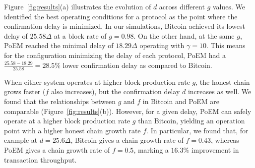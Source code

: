 Figure~\ref{fig:results}(a) illustrates the evolution of $d$ across different $g$ values. We
identified the best operating conditions for a protocol as the point where the
confirmation delay is minimized. In our simulations, Bitcoin achieved its lowest
delay of $25.58 \Delta$ at a block rate of $g=0.98$. On the other hand, at the same
$g$, PoEM reached the minimal delay of $18.29 \Delta$ operating with
$\gamma=10$. This means for the configuration minimizing the delay of each protocol,
PoEM had a $\frac{25.58 - 18.29}{25.58} = 28.5\%$ lower confirmation delay as compared to Bitcoin.

When either system operates at higher block production rate $g$, the honest chain
grows faster ($f$ also increases), but the confirmation delay $d$ increases as well.
We found that the relationships between $g$ and $f$ in Bitcoin and PoEM are
comparable (Figure~\ref{fig:results}(b)). However, for a given delay, PoEM can
safely operate at a higher block production rate $g$ than Bitcoin, yielding an
operation point with a higher honest chain growth rate $f$. In particular, we
found that, for example at $d = 25.6\Delta$, Bitcoin gives a chain growth rate
of $f = 0.43$, whereas PoEM gives a chain growth rate of $f = 0.5$, marking a
$16.3\%$ improvement in transaction throughput.
